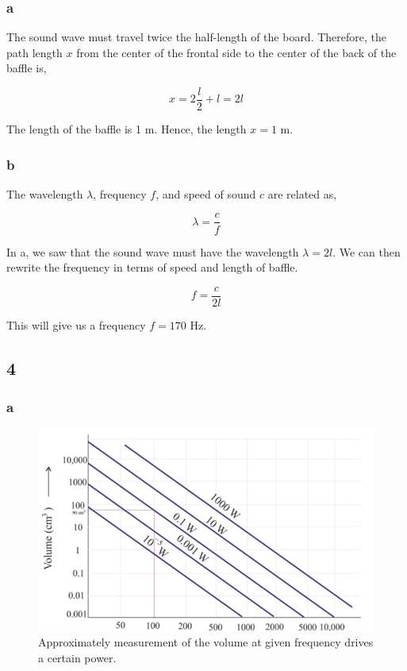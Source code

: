 \documentclass{article}
\begin{document}
\subsubsection*{a}

The sound wave must travel twice the half-length of the board. Therefore, the path length $x$ from the center of the frontal side to the center of the back of the baffle is,

\begin{equation}
    x = 2 \frac{l}{2}+l = 2l
\end{equation}

The length of the baffle is 1 m. Hence, the length $x = 1 $ m.

\subsubsection*{b}

The wavelength $\lambda$, frequency $f$, and speed of sound $c$ are related as,

\begin{equation}
    \lambda = \frac{c}{f}
\end{equation}

In a, we saw that the sound wave must have the wavelength $\lambda = 2l$. We can then rewrite the frequency in terms of speed and length of baffle.

\begin{equation}
    f=\frac{c}{2l}
\end{equation}

This will give us a frequency $f=170$  Hz.

\subsection*{4}

\subsubsection*{a}
\begin{figure}[H]
    \centering
    \includegraphics[scale = 1.4]{figures/oving3_2_solutions.png}
    \caption{Approximately measurement of the volume at given frequency drives a certain power.}
    \label{fig:loudsp}
\end{figure}
\end{document}
